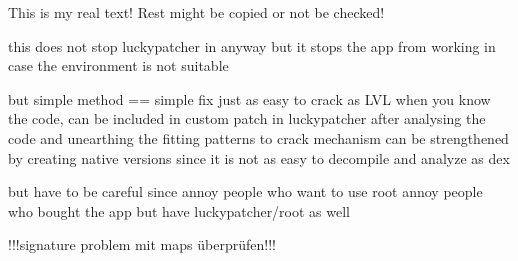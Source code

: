 This is my real text! Rest might be copied or not be checked!

this does not stop luckypatcher in anyway but it stops the app from working in case the environment is not suitable

but simple method == simple fix
just as easy to crack as LVL when you know the code, can be included in custom patch in luckypatcher after analysing the code and unearthing the fitting patterns to crack
mechanism can be strengthened by creating native versions since it is not as easy to decompile and analyze as dex

but have to be careful since
annoy people who want to use root
annoy people who bought the app but have luckypatcher/root as well


!!!signature problem  mit maps überprüfen!!!
